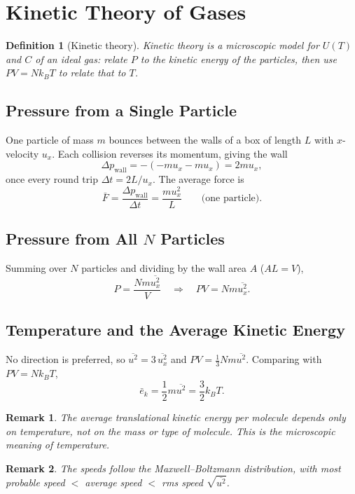 \documentclass{article}
\newtheorem{definition}{Definition}
\newtheorem{remark}{Remark}
\begin{document}
\section{Kinetic Theory of Gases}

\begin{definition}[Kinetic theory]
    Kinetic theory is a microscopic model for $U(T)$ and $C$ of an ideal gas: relate $P$ to the kinetic energy of the particles, then use $PV = Nk_BT$ to relate that to $T$.
\end{definition}

\subsection{Pressure from a Single Particle}
One particle of mass $m$ bounces between the walls of a box of length $L$ with $x$-velocity $u_x$. Each collision reverses its momentum, giving the wall
\[\Delta p_{\text{wall}} = -(-m u_x - m u_x) = 2 m u_x,\]
once every round trip $\Delta t = 2L/u_x$. The average force is
\[\bar{F} = \frac{\Delta p_{\text{wall}}}{\Delta t} = \frac{m u_x^2}{L} \qquad \text{(one particle)}.\]

\subsection{Pressure from All $N$ Particles}
Summing over $N$ particles and dividing by the wall area $A$ ($AL = V$),
\[P = \frac{N m \overline{u_x^2}}{V} \quad \Longrightarrow \quad PV = N m \overline{u_x^2}.\]

\subsection{Temperature and the Average Kinetic Energy}
No direction is preferred, so $\overline{u^2} = 3\,\overline{u_x^2}$ and $PV = \tfrac{1}{3} N m \overline{u^2}$. Comparing with $PV = Nk_BT$,
\[\bar{e}_k = \frac{1}{2} m \overline{u^2} = \frac{3}{2} k_B T.\]

\begin{remark}
    The average translational kinetic energy per molecule depends only on temperature, not on the mass or type of molecule. This is the microscopic meaning of temperature.
\end{remark}
\begin{remark}
    The speeds follow the Maxwell--Boltzmann distribution, with most probable speed $<$ average speed $<$ rms speed $\sqrt{\overline{u^2}}$.
\end{remark}
\end{document}
